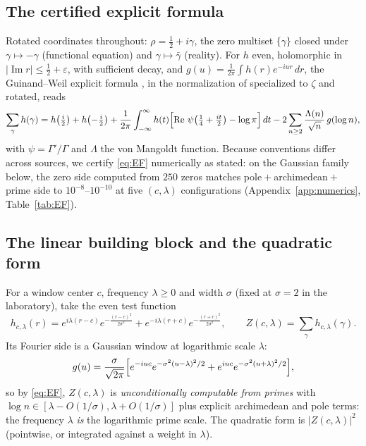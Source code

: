 \documentclass[11pt]{amsart}
\theoremstyle{plain}
\theoremstyle{definition}
\theoremstyle{remark}
\newcommand{\re}{\operatorname{Re}}
\newcommand{\im}{\operatorname{Im}}
\newcommand{\dd}{\,d}
\begin{document}
\subsection{The certified explicit formula}\label{subsec:EF}

Rotated coordinates throughout: $\rho=\tfrac12+i\gamma$, the zero multiset $\{\gamma\}$ closed
under $\gamma\mapsto-\gamma$ (functional equation) and $\gamma\mapsto\bar\gamma$ (reality). For
$h$ even, holomorphic in $|\im r|\le\tfrac12+\varepsilon$, with sufficient decay, and
$g(u)=\tfrac1{2\pi}\int h(r)e^{-iur}\dd r$, the Guinand--Weil explicit formula
\cite{Guinand1948,Weil1952}, in the normalization of \cite[Thm.~5.12]{IwaniecKowalski2004}
specialized to $\zeta$ and rotated, reads
\begin{equation}\label{eq:EF}
\sum_\gamma h(\gamma)=h\bigl(\tfrac i2\bigr)+h\bigl(-\tfrac i2\bigr)
+\frac1{2\pi}\int_{-\infty}^\infty h(t)\Bigl[\re\,\psi\bigl(\tfrac14+\tfrac{it}2\bigr)
-\log\pi\Bigr]\dd t
-2\sum_{n\ge2}\frac{\Lambda(n)}{\sqrt n}\,g(\log n),
\end{equation}
with $\psi=\Gamma'/\Gamma$ and $\Lambda$ the von Mangoldt function. Because conventions differ
across sources, we certify \eqref{eq:EF} numerically as stated: on the Gaussian family below,
the zero side computed from $250$ zeros matches pole${}+{}$archimedean${}+{}$prime side to
$10^{-8}$--$10^{-10}$ at five $(c,\lambda)$ configurations (Appendix~\ref{app:numerics},
Table~\ref{tab:EF}).

\subsection{The linear building block and the quadratic form}

For a window center $c$, frequency $\lambda\ge0$ and width $\sigma$ (fixed at $\sigma=2$ in the
laboratory), take the even test function
\begin{equation}\label{eq:hfamily}
h_{c,\lambda}(r)=e^{i\lambda(r-c)}e^{-\frac{(r-c)^2}{2\sigma^2}}
+e^{-i\lambda(r+c)}e^{-\frac{(r+c)^2}{2\sigma^2}},
\qquad
Z(c,\lambda)=\sum_\gamma h_{c,\lambda}(\gamma).
\end{equation}
Its Fourier side is a Gaussian window at logarithmic scale $\lambda$:
\[
g(u)=\frac{\sigma}{\sqrt{2\pi}}\Bigl[e^{-iuc}e^{-\sigma^2(u-\lambda)^2/2}
+e^{iuc}e^{-\sigma^2(u+\lambda)^2/2}\Bigr],
\]
so by \eqref{eq:EF}, $Z(c,\lambda)$ is \emph{unconditionally computable from primes} with
$\log n\in[\lambda-O(1/\sigma),\lambda+O(1/\sigma)]$ plus explicit archimedean and pole terms:
the frequency $\lambda$ \emph{is} the logarithmic prime scale. The quadratic form is
$|Z(c,\lambda)|^2$ (pointwise, or integrated against a weight in $\lambda$).
\end{document}
